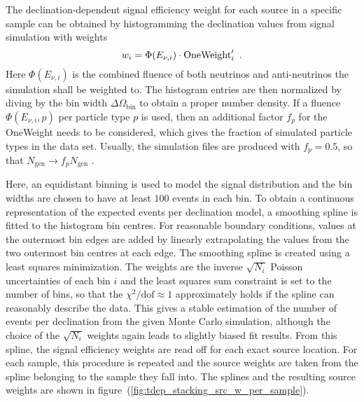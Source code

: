 The declination-dependent signal efficiency weight for each source in a specific sample can be obtained by histogramming the declination values from signal simulation with weights
\begin{equation}
  w_i = \Phi(E_{\nu,i})\cdot\text{OneWeight}'_i
  \enspace\text{.}
\end{equation}
Here $\Phi(E_{\nu,i})$ is the combined fluence of both neutrinos and anti-neutrinos the simulation shall be weighted to.
The histogram entries are then normalized by diving by the bin width $\Delta\Omega_\text{bin}$ to obtain a proper number density.
If a fluence $\Phi(E_{\nu,i}, p)$ per particle type $p$ is used, then an additional factor $f_p$ for the OneWeight needs to be considered, which gives the fraction of simulated particle types in the data set.
Usually, the simulation files are produced with $f_p=0.5$, so that $N_\text{gen}\rightarrow f_p N_\text{gen}$ \cite{Gazizov:2004va}.

Here, an equidistant binning is used to model the signal distribution and the bin widths are chosen to have at least $100$ events in each bin.
To obtain a continuous representation of the expected events per declination model, a smoothing spline is fitted to the histogram bin centres.
For reasonable boundary conditions, values at the outermost bin edges are added by linearly extrapolating the values from the two outermost bin centres at each edge.
The smoothing spline is created using a least squares minimization.
The weights are the inverse $\sqrt{N_i}$ Poisson uncertainties of each bin $i$ and the least squares sum constraint is set to the number of bins, so that the $\chi^2 / \text{dof} \approx 1$ approximately holds if the spline can reasonably describe the data.
This gives a stable estimation of the number of events per declination from the given Monte Carlo simulation, although the choice of the $\sqrt{N_i}$ weights again leads to slightly biased fit results.
From this spline, the signal efficiency weights are read off for each exact source location.
For each sample, this procedure is repeated and the source weights are taken from the spline belonging to the sample they fall into.
The splines and the resulting source weights are shown in figure~(\ref{fig:tdep_stacking_src_w_per_sample}).


